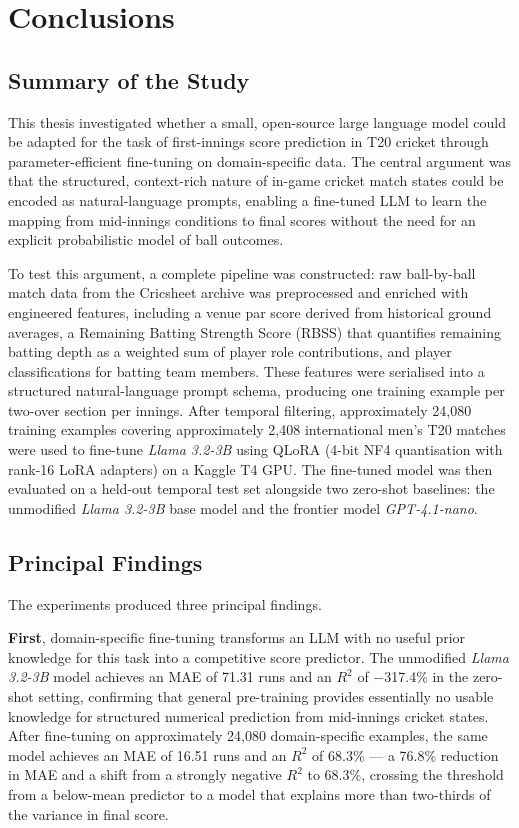 \chapter{Conclusions}

\section{Summary of the Study}

This thesis investigated whether a small, open-source large language model could be adapted for the task of first-innings score prediction in T20 cricket through parameter-efficient fine-tuning on domain-specific data. The central argument was that the structured, context-rich nature of in-game cricket match states could be encoded as natural-language prompts, enabling a fine-tuned LLM to learn the mapping from mid-innings conditions to final scores without the need for an explicit probabilistic model of ball outcomes.

To test this argument, a complete pipeline was constructed: raw ball-by-ball match data from the Cricsheet archive was preprocessed and enriched with engineered features, including a venue par score derived from historical ground averages, a Remaining Batting Strength Score (RBSS) that quantifies remaining batting depth as a weighted sum of player role contributions, and player classifications for batting team members. These features were serialised into a structured natural-language prompt schema, producing one training example per two-over section per innings. After temporal filtering, approximately 24,080 training examples covering approximately 2,408 international men's T20 matches were used to fine-tune \textit{Llama 3.2-3B} using QLoRA (4-bit NF4 quantisation with rank-16 LoRA adapters) on a Kaggle T4 GPU. The fine-tuned model was then evaluated on a held-out temporal test set alongside two zero-shot baselines: the unmodified \textit{Llama 3.2-3B} base model and the frontier model \textit{GPT-4.1-nano}.

\section{Principal Findings}

The experiments produced three principal findings.

\textbf{First}, domain-specific fine-tuning transforms an LLM with no useful prior knowledge for this task into a competitive score predictor. The unmodified \textit{Llama 3.2-3B} model achieves an MAE of 71.31 runs and an $R^2$ of $-$317.4\% in the zero-shot setting, confirming that general pre-training provides essentially no usable knowledge for structured numerical prediction from mid-innings cricket states. After fine-tuning on approximately 24,080 domain-specific examples, the same model achieves an MAE of 16.51 runs and an $R^2$ of 68.3\% --- a 76.8\% reduction in MAE and a shift from a strongly negative $R^2$ to 68.3\%, crossing the threshold from a below-mean predictor to a model that explains more than two-thirds of the variance in final score.

